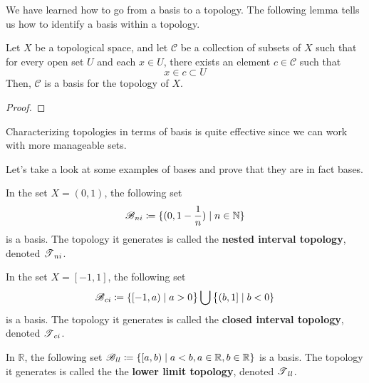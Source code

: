     We have learned how to go from a basis to a topology. The following lemma tells us how to identify a basis within a topology. 

    \begin{theorem}
      Let $X$ be a topological space, and let $\mathcal{C}$ be a collection of subsets of $X$ such that for every open set $U$ and each $x \in U$, there exists an element $c \in \mathcal{C}$ such that
      \begin{equation}
        x \in c \subset U
      \end{equation}
      Then, $\mathcal{C}$ is a basis for the topology of $X$. 
    \end{theorem}
    \begin{proof}
      
    \end{proof} 

    Characterizing topologies in terms of basis is quite effective since we can work with more manageable sets. 

    Let's take a look at some examples of bases and prove that they are in fact bases. 

    \begin{theorem}
      In the set $X = (0,1)$, the following set 
      \begin{equation}
        \B_{ni} \coloneqq \{ (0, 1-\frac{1}{n}) \mid n \in \mathbb{N} \}
      \end{equation}
      is a basis. The topology it generates is called the \textbf{nested interval topology}, denoted $\T_{ni}$. 
    \end{theorem}

    \begin{theorem}[Closed Interval Topology on $[-1, 1\rbrack$]
      In the set $X = [-1, 1]$, the following set 
      \begin{equation}
        \B_{ci} \coloneqq \{ [-1, a) \mid a > 0 \big\} \bigcup \big\{ (b, 1] \mid b<0 \}
      \end{equation}
      is a basis. The topology it generates is called the \textbf{closed interval topology}, denoted $\T_{ci}$. 
    \end{theorem}

    \begin{theorem} 
      In $\mathbb{R}$, the following set $\B_{ll} \coloneqq \{ [a, b) \mid a < b, a \in \mathbb{R}, b \in \mathbb{R} \}$ is a basis. The topology it generates is called the the \textbf{lower limit topology}, denoted $\T_{ll}$. 
    \end{theorem} 

